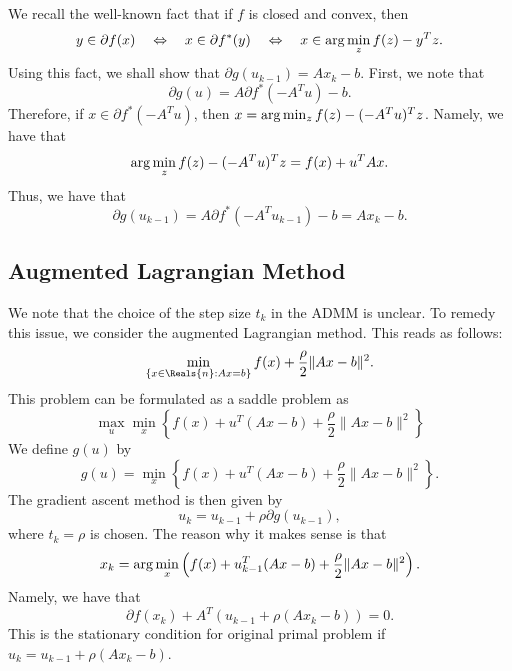 \begin{itemize}
We recall the well-known fact that if $f$ is closed and convex, then 
\begin{equation}
y \in \partial f(x) \quad \Leftrightarrow \quad x \in \partial f^*(y) \quad \Leftrightarrow \quad x \in {\rm arg}\min_z f(z) - y^T z.
\end{equation}
Using this fact, we shall show that $\partial g(u_{k-1}) = Ax_k - b$. First, we note that 
\begin{equation}
\partial g(u) = A \partial f^*(-A^T u) - b. 
\end{equation}
Therefore,  if $x \in \partial f^*(-A^Tu)$, then $x = {\rm arg}\min_z f(z) - (-A^Tu)^T z$. Namely, we have that 
\begin{equation}
{\rm arg}\min_z f(z) - (-A^Tu)^T z = f(x) + u^T A x. 
\end{equation}
Thus, we have that
\begin{equation}
\partial g(u_{k-1}) = A \partial f^*(-A^T u_{k-1}) - b = Ax_{k} - b.  
\end{equation}

\subsection{Augmented Lagrangian Method} 

We note that the choice of the step size $t_k$ in the ADMM is unclear. To remedy this issue, we consider the augmented Lagrangian method. This reads as follows: 
\begin{equation} 
\min_{\{x \in \Reals{n} : Ax = b\}} f(x) + \frac{\rho}{2} \|Ax - b\|^2. 
\end{equation} 
This problem can be formulated as a saddle problem as 
\begin{equation}
\max_u \min_{x} \left \{ f(x) + u^T (Ax - b) + \frac{\rho}{2} \|Ax - b\|^2 \right \}
\end{equation}
We define $g(u)$ by 
\begin{equation} 
g(u) = \min_x \left \{ f(x) + u^T (Ax - b) + \frac{\rho}{2} \|Ax - b\|^2 \right \}. 
\end{equation} 
The gradient ascent method is then given by 
\begin{equation} 
u_k = u_{k-1} + \rho \partial g(u_{k-1}), 
\end{equation} 
where $t_k = \rho$ is chosen. The reason why it makes sense is that 
\begin{equation} 
x_k = {\rm arg}\min_x \left ( f(x) + u_{k-1}^T (Ax - b) + \frac{\rho}{2} \|Ax - b\|^2 \right ). 
\end{equation} 
Namely, we have that
\begin{equation} 
\partial f(x_k) + A^T(u_{k-1} + \rho (A x_k - b)) = 0. 
\end{equation} 
This is the stationary condition for original primal problem if $u_k = u_{k-1} + \rho (A x_k - b)$.   




\end{itemize}
